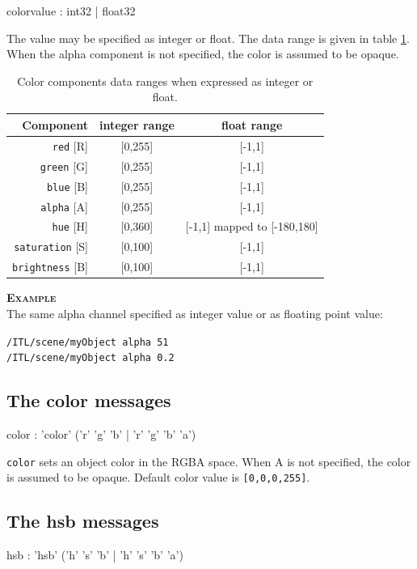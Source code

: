 \documentclass[a4paper,twoside]{report}
\newcommand{\subsublevel}[1]	{\subsection{#1}}
\newcommand{\OSC}[1]		{\texttt{#1}}
\newcommand{\values}[1]	{\texttt{#1}}
\newcommand{\example}		{\textbf{\hspace{-1.5cm}\textbf{\textsc{Example }}}}
\newcommand{\sample}	[1]			{\vspace{-2mm}\begin{center}\colorbox{mygrey}{
								\begin{minipage}[t]{0.9\columnwidth} 
								{\small \texttt{#1}}
								\end{minipage}}\end{center}}
\begin{document}
\begin{rail}
colorvalue :    int32 | float32
\end{rail}

The value may be specified as integer or float. The data range is given in table \ref{colorrange}.
When the alpha component is not specified, the color is assumed to be opaque. 

\begin{table}[htdp]
\begin{center}
\begin{tabular}{|r|c|c|}
\hline
Component & integer range & float range \\
\hline
\OSC{red} [R] 		& [0,255] & [-1,1] \\
\OSC{green} [G] 	& [0,255] & [-1,1] \\
\OSC{blue} [B]		& [0,255] & [-1,1] \\
\OSC{alpha} [A] 	& [0,255] & [-1,1] \\
\OSC{hue} [H] 		& [0,360] & [-1,1] mapped to [-180,180]\\
\OSC{saturation} [S] 	& [0,100] & [-1,1] \\
\OSC{brightness} [B] 	& [0,100] & [-1,1] \\
\hline
\end{tabular}
\end{center}
\caption{Color components data ranges when expressed as integer or float.}
\label{colorrange}
\end{table}%


\example \\
The same alpha channel specified as integer value or as floating point value:
\sample{/ITL/scene/myObject alpha 51 \\
/ITL/scene/myObject alpha 0.2
}

\subsublevel{The color messages}

\begin{rail}
color :		'color' ('r' 'g' 'b' | 'r' 'g' 'b' 'a') 
\end{rail}

\OSC{color} sets an object color in the RGBA space.
When A is not specified, the color is assumed to be opaque. 
Default color value is \values{[0,0,0,255]}.


\subsublevel{The hsb messages}

\begin{rail}
hsb :		'hsb' ('h' 's' 'b' | 'h' 's' 'b' 'a') 
\end{rail}
\end{document}
